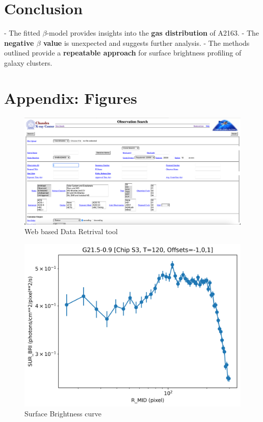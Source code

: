 \documentclass[a4paper,12pt]{article}
\begin{document}
\section{Conclusion}
- The fitted $\beta$-model provides insights into the \textbf{gas distribution} of A2163.
- The \textbf{negative $\beta$ value} is unexpected and suggests further analysis.
- The methods outlined provide a \textbf{repeatable approach} for surface brightness profiling of galaxy clusters.

\appendix
\section{Appendix: Figures}

\begin{figure}[h!]
    \centering
    \includegraphics[width=\linewidth]{data_retrival.png}
    \caption{Web based Data Retrival tool}
    \label{fig:Chanda Archive reterival tool}
\end{figure}

\begin{figure}[h!]
    \centering\includegraphics[width=\linewidth]{surface_brightness.png}
    \caption{Surface Brightness curve}
    \label{fig:Radial Profile Fit}
\end{figure}
\end{document}
